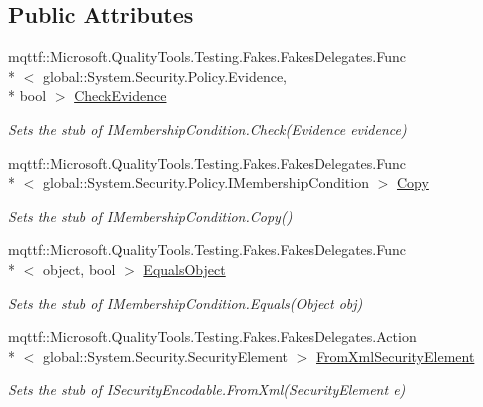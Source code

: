 \subsection*{Public Attributes}
\begin{DoxyCompactItemize}
\item 
mqttf\-::\-Microsoft.\-Quality\-Tools.\-Testing.\-Fakes.\-Fakes\-Delegates.\-Func\\*
$<$ global\-::\-System.\-Security.\-Policy.\-Evidence, \\*
bool $>$ \hyperlink{class_system_1_1_security_1_1_policy_1_1_fakes_1_1_stub_i_membership_condition_ac3fd8dedd25d3cbf9599fe3ca598a0f0}{Check\-Evidence}
\begin{DoxyCompactList}\small\item\em Sets the stub of I\-Membership\-Condition.\-Check(\-Evidence evidence)\end{DoxyCompactList}\item 
mqttf\-::\-Microsoft.\-Quality\-Tools.\-Testing.\-Fakes.\-Fakes\-Delegates.\-Func\\*
$<$ global\-::\-System.\-Security.\-Policy.\-I\-Membership\-Condition $>$ \hyperlink{class_system_1_1_security_1_1_policy_1_1_fakes_1_1_stub_i_membership_condition_a08b5b42d946f303ac1fe3d8d9c3acf94}{Copy}
\begin{DoxyCompactList}\small\item\em Sets the stub of I\-Membership\-Condition.\-Copy()\end{DoxyCompactList}\item 
mqttf\-::\-Microsoft.\-Quality\-Tools.\-Testing.\-Fakes.\-Fakes\-Delegates.\-Func\\*
$<$ object, bool $>$ \hyperlink{class_system_1_1_security_1_1_policy_1_1_fakes_1_1_stub_i_membership_condition_a60e1201c9995052ddee9b410fbf4eaba}{Equals\-Object}
\begin{DoxyCompactList}\small\item\em Sets the stub of I\-Membership\-Condition.\-Equals(\-Object obj)\end{DoxyCompactList}\item 
mqttf\-::\-Microsoft.\-Quality\-Tools.\-Testing.\-Fakes.\-Fakes\-Delegates.\-Action\\*
$<$ global\-::\-System.\-Security.\-Security\-Element $>$ \hyperlink{class_system_1_1_security_1_1_policy_1_1_fakes_1_1_stub_i_membership_condition_af987145a8493614d84b91f1bdd3d138f}{From\-Xml\-Security\-Element}
\begin{DoxyCompactList}\small\item\em Sets the stub of I\-Security\-Encodable.\-From\-Xml(\-Security\-Element e)\end{DoxyCompactList}\item 

\end{DoxyCompactItemize}
